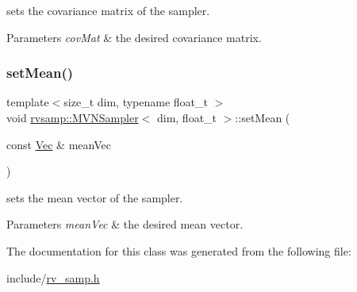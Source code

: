 sets the covariance matrix of the sampler. 


\begin{DoxyParams}{Parameters}
{\em cov\+Mat} & the desired covariance matrix. \\
\hline
\end{DoxyParams}
\mbox{\label{classrvsamp_1_1MVNSampler_a99b3bae7eb823d0bfcbbccf89555569e}} 
\subsubsection{\texorpdfstring{set\+Mean()}{setMean()}}
{\footnotesize\ttfamily template$<$size\+\_\+t dim, typename float\+\_\+t $>$ \\
void \hyperlink{classrvsamp_1_1MVNSampler}{rvsamp\+::\+M\+V\+N\+Sampler}$<$ dim, float\+\_\+t $>$\+::set\+Mean (\begin{DoxyParamCaption}\item[{const \hyperlink{classrvsamp_1_1MVNSampler_a1110bc1695c5c959914602dbaf2f6878}{Vec} \&}]{mean\+Vec }\end{DoxyParamCaption})}



sets the mean vector of the sampler. 


\begin{DoxyParams}{Parameters}
{\em mean\+Vec} & the desired mean vector. \\
\hline
\end{DoxyParams}


The documentation for this class was generated from the following file\+:\begin{DoxyCompactItemize}
\item 
include/\hyperlink{rv__samp_8h}{rv\+\_\+samp.\+h}\end{DoxyCompactItemize}
